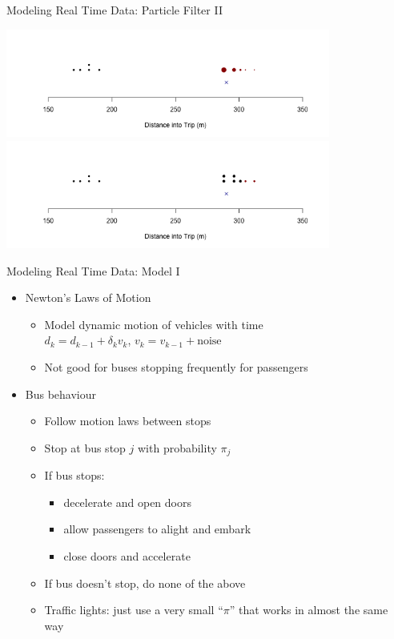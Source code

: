 \documentclass[10pt,t]{beamer}
\begin{document}
\begin{frame}{Modeling Real Time Data: Particle Filter II}
\begin{overprint}
    \centering
    \includegraphics[width=0.8\textwidth]{figs/pf1-frame5.png}
    \centering
    \includegraphics[width=0.8\textwidth]{figs/pf1-frame6.png}
  \end{overprint}
  \onslide<+->
\end{frame}


\begin{frame}{Modeling Real Time Data: Model I}
  \onslide<+->
  \begin{itemize}[<+- | alert@+>]
    \item Newton's Laws of Motion
      \begin{itemize}[<1->]
        \item Model dynamic motion of vehicles with time\\
          $d_k = d_{k-1} + \delta_k v_{k}$, $v_k = v_{k-1} + \text{noise}$
        \item Not good for buses stopping frequently for passengers
      \end{itemize}

    \item Bus behaviour
      \begin{itemize}
        \item Follow motion laws between stops
        \item Stop at bus stop $j$ with probability $\pi_j$
        \item If bus stops:
          \begin{itemize}[<1->]
            \item decelerate and open doors
            \item allow passengers to alight and embark
            \item close doors and accelerate
          \end{itemize}
        \item If bus doesn't stop, do none of the above
        \item Traffic lights: just use a very small ``$\pi$''
          that works in almost the same way
      \end{itemize}
  \end{itemize}
  \onslide<+->
\end{frame}
\end{document}

